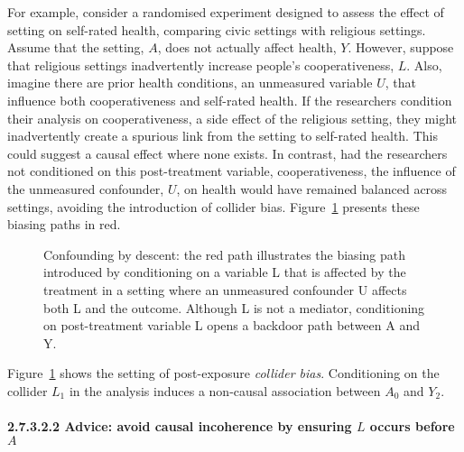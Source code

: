 \documentclass[
  singlecolumn]{article}
\let\oldparagraph\paragraph
\renewcommand{\paragraph}[1]{\oldparagraph{#1}\mbox{}}
\begin{document}
For example, consider a randomised experiment designed to assess the
effect of setting on self-rated health, comparing civic settings with
religious settings. Assume that the setting, \(A\), does not actually
affect health, \(Y\). However, suppose that religious settings
inadvertently increase people's cooperativeness, \(L\). Also, imagine
there are prior health conditions, an unmeasured variable \(U\), that
influence both cooperativeness and self-rated health. If the researchers
condition their analysis on cooperativeness, a side effect of the
religious setting, they might inadvertently create a spurious link from
the setting to self-rated health. This could suggest a causal effect
where none exists. In contrast, had the researchers not conditioned on
this post-treatment variable, cooperativeness, the influence of the
unmeasured confounder, \(U\), on health would have remained balanced
across settings, avoiding the introduction of collider bias.
Figure~\ref{fig-dag-descendant} presents these biasing paths in red.

\begin{figure}


\caption{\label{fig-dag-descendant}Confounding by descent: the red path
illustrates the biasing path introduced by conditioning on a variable L
that is affected by the treatment in a setting where an unmeasured
confounder U affects both L and the outcome. Although L is not a
mediator, conditioning on post-treatment variable L opens a backdoor
path between A and Y.}

\end{figure}%

Figure~\ref{fig-dag-descendant} shows the setting of post-exposure
\emph{collider bias}. Conditioning on the collider \(L_{1}\) in the
analysis induces a non-causal association between \(A_{0}\) and
\(Y_{2}\).

\paragraph{\texorpdfstring{2.7.3.2.2 Advice: avoid causal incoherence by
ensuring \(L\) occurs before
\(A\)}{2.7.3.2.2 Advice: avoid causal incoherence by ensuring L occurs before A}}\label{advice-avoid-causal-incoherence-by-ensuring-l-occurs-before-a-3}
\end{document}
